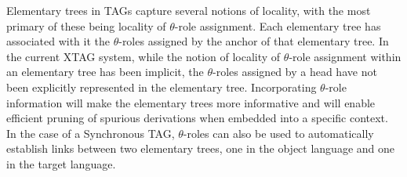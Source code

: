 Elementary trees in TAGs capture several notions of locality, with the most
primary of these being locality of $\theta$-role assignment.  Each elementary
tree has associated with it the $\theta$-roles assigned by the anchor of that
elementary tree.  In the current XTAG system, while the notion of locality of
$\theta$-role assignment within an elementary tree has been implicit, the
$\theta$-roles assigned by a head have not been explicitly represented in the
elementary tree. Incorporating $\theta$-role information will make the
elementary trees more informative and will enable efficient pruning of spurious
derivations when embedded into a specific context.  In the case of a
Synchronous TAG, $\theta$-roles can also be used to automatically establish
links between two elementary trees, one in the object language and one in the
target language.





















